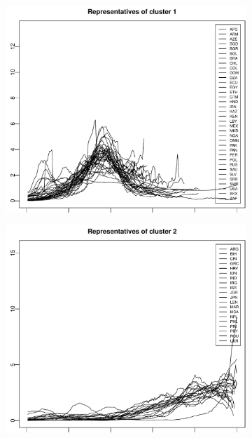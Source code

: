 \documentclass[a4paper,11pt]{article}
\numberwithin{equation}{section}
\begin{document}
\begin{figure}[t!]
\centering
\begin{subfigure}[b]{0.475\textwidth}
\includegraphics[width=\textwidth]{plots/results_cluster_1}
\caption{}\label{fig:cl1}
\end{subfigure}\hspace{0.25cm}
\begin{subfigure}[b]{0.475\textwidth}
\includegraphics[width=\textwidth]{plots/results_cluster_2}
\caption{}\label{fig:cl2}

\end{subfigure}
\end{figure}
\end{document}
